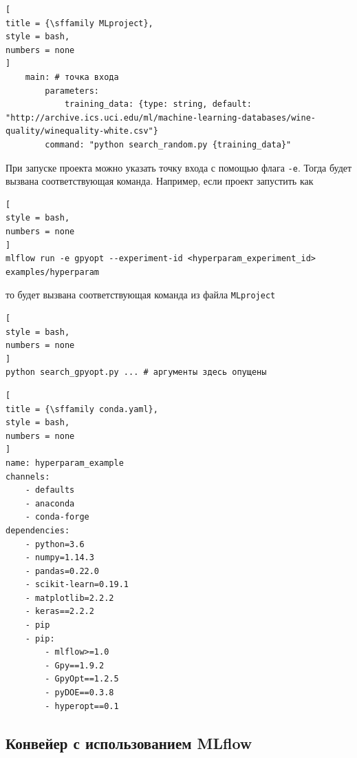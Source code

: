 \documentclass[%
	11pt,
	a4paper,
	utf8,
		]{article}
\begin{document}
\begin{lstlisting}[
title = {\sffamily MLproject},
style = bash,
numbers = none	
]
	main: # точка входа
		parameters:
			training_data: {type: string, default: "http://archive.ics.uci.edu/ml/machine-learning-databases/wine-quality/winequality-white.csv"}
		command: "python search_random.py {training_data}"
\end{lstlisting}

При запуске проекта можно указать точку входа с помощью флага \verb|-e|. Тогда будет вызвана соответствующая команда. Например, если проект запустить как
\begin{lstlisting}[
style = bash,
numbers = none	
]
mlflow run -e gpyopt --experiment-id <hyperparam_experiment_id> examples/hyperparam
\end{lstlisting}
то будет вызвана соответствующая команда из файла \texttt{MLproject}
\begin{lstlisting}[
style = bash,
numbers = none	
]
python search_gpyopt.py ... # аргументы здесь опущены
\end{lstlisting}

\begin{lstlisting}[
title = {\sffamily conda.yaml},
style = bash,
numbers = none	
]
name: hyperparam_example
channels:
	- defaults
	- anaconda
	- conda-forge
dependencies:
	- python=3.6
	- numpy=1.14.3
	- pandas=0.22.0
	- scikit-learn=0.19.1
	- matplotlib=2.2.2
	- keras==2.2.2
	- pip
	- pip:
		- mlflow>=1.0
		- Gpy==1.9.2
		- GpyOpt==1.2.5
		- pyDOE==0.3.8
		- hyperopt==0.1
\end{lstlisting}

\subsection{Конвейер с использованием MLflow}
\end{document}
